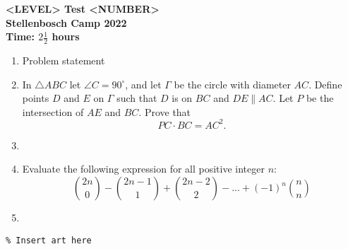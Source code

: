 \documentclass{article}
\begin{document}
\thispagestyle{empty}

\begin{center}
  \textbf{\Large <LEVEL> Test <NUMBER>}
  \\ \vspace{1em}
  \textbf{\large Stellenbosch Camp 2022}
  \\ \vspace{1em}
  \textbf{\large Time: $2\frac{1}{2}$ hours}
\end{center}

\bigskip

\vfill

\begin{enumerate}[itemsep=\fill]

\item %
Problem statement


\item %
In $\triangle ABC$ let $\angle C = 90^\circ$, and let $\Gamma$ be the circle with diameter $AC$. Define points $D$ and $E$ on $\Gamma$ such that $D$ is on $BC$ and $DE \parallel AC$. Let $P$ be the intersection of $AE$ and $BC$. Prove that
\[ PC \cdot BC = AC^2. \]

\vspace{0pt}


\item %


\item %
Evaluate the following expression for all positive integer $n$:
\[ {2n \choose 0} -{2n-1 \choose 1}+{2n-2 \choose 2}-...+(-1)^n{n \choose n} \]


\item %

\end{enumerate}


\vfill
\centering
\small
\begin{BVerbatim}
\end{BVerbatim}
\end{document}
